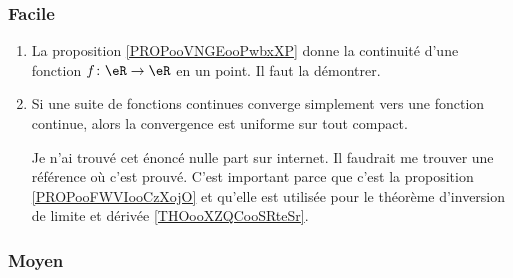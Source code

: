 \subsubsection{Facile}

\begin{enumerate}
    \item
        La proposition \ref{PROPooVNGEooPwbxXP} donne la continuité d'une fonction \( f\colon \eR\to \eR\) en un point. Il faut la démontrer.
    \item
        Si une suite de fonctions continues converge simplement vers une fonction continue, alors la convergence est uniforme sur tout compact.

        Je n'ai trouvé cet énoncé nulle part sur internet. Il faudrait me trouver une référence où c'est prouvé. C'est important parce que c'est la proposition \ref{PROPooFWVIooCzXojO} et qu'elle est utilisée pour le théorème d'inversion de limite et dérivée \ref{THOooXZQCooSRteSr}.
\end{enumerate}

\subsubsection{Moyen}

